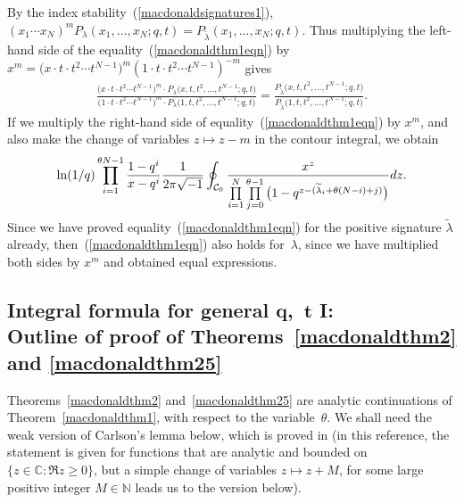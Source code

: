 \documentclass[11pt]{article}
\numberwithin{equation}{section}
\newcommand{\C}{\mathbb{C}}
\newcommand{\N}{\mathbb{N}}
\newcommand{\CC}{\mathcal{C}}
\begin{document}
By the index stability~(\ref{macdonaldsignatures1}), $(x_1\cdots x_N)^m P_{\lambda}(x_1, \dots, x_N; q, t) = P_{\widetilde{\lambda}}(x_1, \dots, x_N; q, t)$. Thus multiplying the left-hand side of the equality~(\ref{macdonaldthm1eqn}) by $x^m = \big(x\cdot t\cdot t^2\cdots t^{N-1}\big)^m(1\cdot t\cdot t^2\cdots t^{N-1})^{-m}$ gives
\begin{gather*}
\frac{\big(x\cdot t\cdot t^2\cdots t^{N-1}\big)^m \cdot P_{\lambda}\big(x, t, t^2, \dots, t^{N-1}; q, t\big)}{\big(1\cdot t\cdot t^2\cdots t^{N-1}\big)^m \cdot P_{\lambda}\big(1, t, t^2, \dots, t^{N-1}; q, t\big)} = \frac{P_{\widetilde{\lambda}}\big(x, t, t^2, \dots, t^{N-1}; q, t\big)}{P_{\widetilde{\lambda}}\big(1, t, t^2, \dots, t^{N-1}; q, t\big)}.
\end{gather*}
If we multiply the right-hand side of equality~(\ref{macdonaldthm1eqn}) by $x^m$, and also make the change of variables $z\mapsto z-m$ in the contour integral, we obtain
\begin{gather*}
\ln(1/q)\prod_{i=1}^{\theta N - 1}{\frac{1 - q^i}{x - q^i}}\frac{1}{2\pi\sqrt{-1}}\oint_{\CC_0}{\frac{x^z}{\prod\limits_{i=1}^N\prod\limits_{j=0}^{\theta -1}{\big(1 - q^{z - (\widetilde{\lambda}_i + \theta(N-i) + j)}\big)}}{\rm d}z}.
\end{gather*}
Since we have proved equality~(\ref{macdonaldthm1eqn}) for the positive signature $\widetilde{\lambda}$ already, then~(\ref{macdonaldthm1eqn}) also holds for~$\lambda$, since we have multiplied both sides by $x^m$ and obtained equal expressions.

\subsection[Integral formula for general $q$,~$t$ I: Outline of proof of Theorems~\ref{macdonaldthm2} and \ref{macdonaldthm25}]{Integral formula for general $\boldsymbol{q}$,~$\boldsymbol{t}$ I:\\ Outline of proof of Theorems~\ref{macdonaldthm2} and \ref{macdonaldthm25}}

Theorems~\ref{macdonaldthm2} and~\ref{macdonaldthm25} are analytic continuations of Theorem~\ref{macdonaldthm1}, with respect to the variable~$\theta$.
We shall need the weak version of Carlson's lemma below, which is proved in \cite[Theorem~2.8.1]{AAR} (in this reference, the statement is given for functions that are analytic and bounded on $\{z\in\C\colon \Re z \geq 0\}$, but a simple change of variables $z\mapsto z+M$, for some large positive integer $M\in\N$ leads us to the version below).
\end{document}

